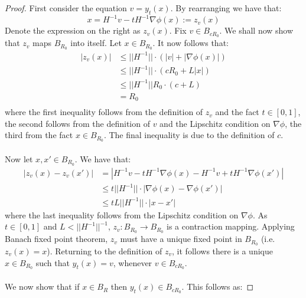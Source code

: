 \documentclass[11pt]{article}
\newcommand{\1}{\mathbf{1}}
\theoremstyle{definition}
\theoremstyle{remark}
\begin{document}
\begin{proof}
    First consider the equation $v=y_t(x)$. By rearranging we have that:
    \begin{equation}\nonumber
        x = H^{-1}v - tH^{-1}\nabla\phi(x) := z_v(x)
    \end{equation}
    Denote the expression on the right as $z_v(x)$. Fix $v \in B_{cR_0}$. We shall now show that $z_v$ maps $B_{R_0}$ into itself. Let $x \in B_{R_0}$. It now follows that:
    \begin{equation}\nonumber
        \begin{split}
            |z_v(x)| & \leq  ||H^{-1}||\cdot(|v| + |\nabla\phi(x)|) \\
            & \leq  ||H^{-1}||\cdot(cR_0 + L|x|) \\
            & \leq  ||H^{-1}||R_0\cdot(c + L) \\
            & = R_0 \\
        \end{split}
    \end{equation}
    where the first inequality follows from the definition of $z_v$ and the fact $t\in[0,1]$, the second follows from the definition of $v$ and the Lipschitz condition on $\nabla \phi$, the third from the fact $x \in B_{R_0}$. The final inequality is due to the definition of $c$.\\
    \\
    Now let $x,x'\in B_{R_0}$. We have that:
    \begin{equation}\nonumber
        \begin{split}
            |z_v(x)-z_v(x')| & = |H^{-1}v-tH^{-1}\nabla \phi(x)-H^{-1}v+tH^{-1}\nabla \phi(x')| \\
            & \leq t||H^{-1}|| \cdot |\nabla \phi(x)-\nabla\phi(x')| \\
            & \leq tL ||H^{-1}|| \cdot |x-x'|
        \end{split}
    \end{equation}
    where the last inequality follows from the Lipschitz condition on $\nabla\phi$. As $t\in[0,1]$ and $L<||H^{-1}||^{-1}$, $z_v:B_{R_0}\rightarrow B_{R_0}$ is a contraction mapping. Applying Banach fixed point theorem, $z_v$ must have a unique fixed point in $B_{R_0}$ (i.e. $z_v(x)=x$). Returning to the definition of $z_v$, it follows there is a unique $x\in B_{R_0}$ such that $y_t(x)=v$, whenever $v \in B_{cR_0}$.\\
    \\
    We now show that if $x\in B_{R}$ then $y_t(x)\in B_{cR_0}$. This follows as:

\end{proof}
\end{document}
